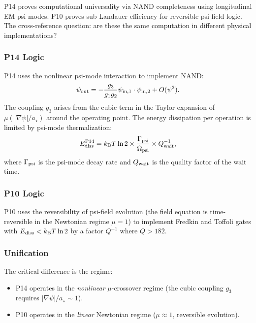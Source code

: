 \documentclass[11pt]{article}
\theoremstyle{definition}
\theoremstyle{remark}
\newcommand{\abs}[1]{\left|#1\right|}
\begin{document}
P14 proves computational universality via NAND completeness using longitudinal
EM psi-modes. P10 proves sub-Landauer efficiency for reversible psi-field logic.
The cross-reference question: are these the same computation in different
physical implementations?

\subsubsection{P14 Logic}

P14 uses the nonlinear psi-mode interaction to implement NAND:
\begin{equation}
\psi_{\rm out} = -\frac{g_3}{g_1 g_2}\psi_{\rm in,1}\cdot\psi_{\rm in,2}
+ O(\psi^3).
\end{equation}
The coupling $g_3$ arises from the cubic term in the Taylor expansion of
$\mu(\abs{\nabla\psi}/a_\star)$ around the operating point. The energy
dissipation per operation is limited by psi-mode thermalization:
\begin{equation}
E_{\rm diss}^{\rm P14} = k_{\rm B}T\ln 2 \times
\frac{\Gamma_{\rm psi}}{\Omega_{\rm psi}} \times Q_{\rm wait}^{-1},
\end{equation}
where $\Gamma_{\rm psi}$ is the psi-mode decay rate and $Q_{\rm wait}$
is the quality factor of the wait time.

\subsubsection{P10 Logic}

P10 uses the reversibility of psi-field evolution (the field equation is
time-reversible in the Newtonian regime $\mu = 1$) to implement Fredkin
and Toffoli gates with $E_{\rm diss} < k_{\rm B}T\ln 2$ by a factor
$Q^{-1}$ where $Q > 182$.

\subsubsection{Unification}

The critical difference is the regime:
\begin{itemize}
\item P14 operates in the \emph{nonlinear} $\mu$-crossover regime (the
  cubic coupling $g_3$ requires $\abs{\nabla\psi}/a_\star \sim 1$).
\item P10 operates in the \emph{linear} Newtonian regime ($\mu \approx 1$,
  reversible evolution).
\end{itemize}
\end{document}
